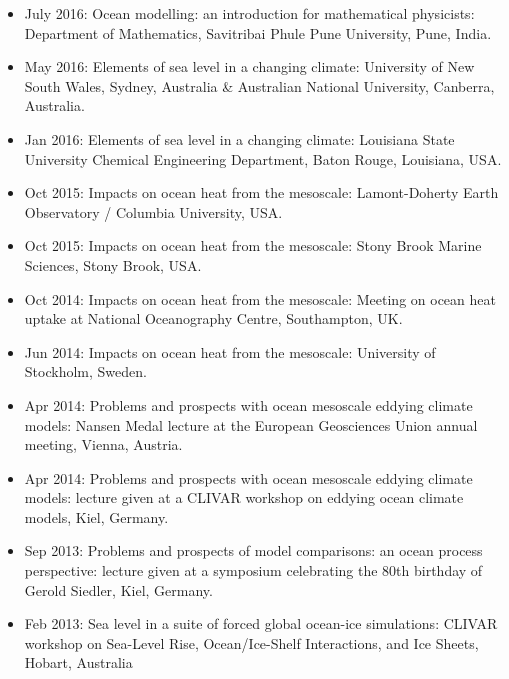 \begin{itemize}[leftmargin=*]
\item July 2016: {\sc Ocean modelling: an introduction for
    mathematical physicists}: Department of Mathematics, Savitribai
  Phule Pune University, Pune, India.

\item May 2016: {\sc Elements of sea level in a changing climate}:
  University of New South Wales, Sydney, Australia \& Australian
  National University, Canberra, Australia.

\item Jan 2016: {\sc Elements of sea level in a changing climate}:
  Louisiana State University Chemical Engineering Department, Baton
  Rouge, Louisiana, USA.

\item Oct 2015: {\sc Impacts on ocean heat from the mesoscale}:
  Lamont-Doherty Earth Observatory / Columbia University, USA.

\item Oct 2015: {\sc Impacts on ocean heat from the mesoscale}: Stony
  Brook Marine Sciences, Stony Brook, USA.

\item Oct 2014: {\sc Impacts on ocean heat from the mesoscale}:
  Meeting on ocean heat uptake at National Oceanography Centre,
  Southampton, UK.

\item Jun 2014: {\sc Impacts on ocean heat from the mesoscale}:
  University of Stockholm, Sweden.

\item Apr 2014: {\sc Problems and prospects with ocean mesoscale
    eddying climate models}: Nansen Medal lecture at the European
  Geosciences Union annual meeting, Vienna, Austria.

\item Apr 2014: {\sc Problems and prospects with ocean mesoscale
    eddying climate models}: lecture given at a CLIVAR workshop on
  eddying ocean climate models, Kiel, Germany.

\item Sep 2013: {\sc Problems and prospects of model comparisons: an
    ocean process perspective}: lecture given at a symposium
  celebrating the 80th birthday of Gerold Siedler, Kiel, Germany.

\item Feb 2013: {\sc Sea level in a suite of forced global ocean-ice
    simulations}: CLIVAR workshop on Sea-Level Rise, Ocean/Ice-Shelf
  Interactions, and Ice Sheets, Hobart, Australia


\end{itemize}
